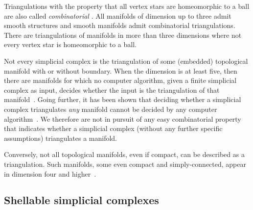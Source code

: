 \documentclass[10pt,a4paper]{article}
\begin{document}
\begin{remark}
    Triangulations with the property that all vertex stars are homeomorphic to a ball are also called \emph{combinatorial} \cite[Section~1]{Bagchi2005}.
    All manifolds of dimension up to three admit smooth structures and smooth manifolds admit combinatorial triangulations. 
    There are triangulations of manifolds in more than three dimensions where not every vertex star is homeomorphic to a ball. 
    
    Not every simplicial complex is the triangulation of some (embedded) topological manifold with or without boundary. 
    When the dimension is at least five, then there are manifolds for which no computer algorithm, given a finite simplicial complex as input, decides whether the input is the triangulation of that manifold~\cite{chernavsky2006unrecognizability}.
    Going further, it has been shown that deciding whether a simplicial complex triangulates \emph{any} manifold cannot be decided by any computer algorithm~\cite{poonen2014undecidable}.     
    We therefore are not in pursuit of any easy combinatorial property that indicates whether a simplicial complex (without any further specific assumptions) triangulates a manifold.

    Conversely, not all topological manifolds, even if compact, can be described as a triangulation. 
    Such manifolds, some even compact and simply-connected, appear in dimension four and higher~\cite{akbulut2014casson}.
\end{remark}








\subsection{Shellable simplicial complexes}\label{subsection:shellability}
\end{document}
